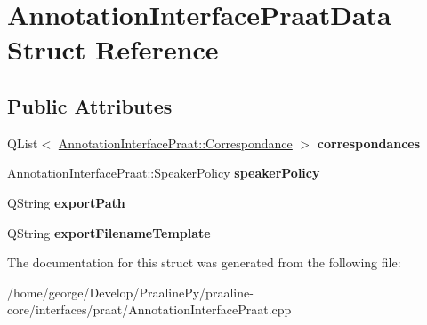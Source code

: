 \hypertarget{struct_annotation_interface_praat_data}{}\section{Annotation\+Interface\+Praat\+Data Struct Reference}
\label{struct_annotation_interface_praat_data}
\subsection*{Public Attributes}
\begin{DoxyCompactItemize}
\item 
\mbox{\label{struct_annotation_interface_praat_data_a35e5c13632dc83386b559a746b26ccdf}} 
Q\+List$<$ \hyperlink{class_annotation_interface_praat_1_1_correspondance}{Annotation\+Interface\+Praat\+::\+Correspondance} $>$ {\bfseries correspondances}
\item 
\mbox{\label{struct_annotation_interface_praat_data_a963175d35040f2463f36061842d2f141}} 
Annotation\+Interface\+Praat\+::\+Speaker\+Policy {\bfseries speaker\+Policy}
\item 
\mbox{\label{struct_annotation_interface_praat_data_aa9a6474e77e40baf2fd2698cfaec23d6}} 
Q\+String {\bfseries export\+Path}
\item 
\mbox{\label{struct_annotation_interface_praat_data_ab0d2662f4b94a6a3e3c707765c26027a}} 
Q\+String {\bfseries export\+Filename\+Template}
\end{DoxyCompactItemize}


The documentation for this struct was generated from the following file\+:\begin{DoxyCompactItemize}
\item 
/home/george/\+Develop/\+Praaline\+Py/praaline-\/core/interfaces/praat/Annotation\+Interface\+Praat.\+cpp\end{DoxyCompactItemize}
